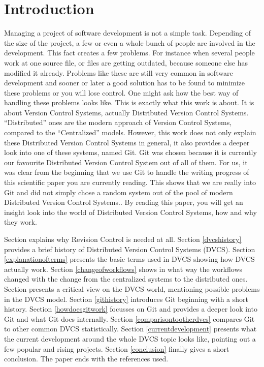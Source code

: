 \section {Introduction}

Managing a project of software development is not a simple task. Depending of the size of the project, a few or even a whole bunch of people are involved in the development. This fact creates a few problems. For instance when several people work at one source file, or files are getting outdated, because someone else has modified it already. Problems like these are still very common in software development and sooner or later a good solution has to be found to minimize these problems or you will lose control. One might ask how the best way of handling these problems looks like.
This is exactly what this work is about. It is about Version Control Systems, actually Distributed Version Control Systems. "`Distributed"' ones are the modern approach of Version Control Systems, compared to the "`Centralized"' models. However, this work does not only explain these Distributed Version Control Systems in general, it also provides a deeper look into one of these systems, named Git.
Git was chosen because it is currently our favourite Distributed Version Control System out of all of them. For us, it was clear from the beginning that we use Git to handle the writing progress of this scientific paper you are currently reading. This shows that we are really into Git and did not simply chose a random system out of the pool of modern Distributed Version Control Systems..
By reading this paper, you will get an insight look into the world of Distributed Version Control Systems, how and why they work.

Section \label{whyrevisioncontrol} explains why Revision Control is needed at all. Section \ref{dvcshistory} provides a brief history of Distributed Version Control Systems (DVCS). Section \ref{explanationofterms} presents the basic terms used in DVCS showing how DVCS actually work. Section \ref{changeofworkflows} shows in what way the workflows changed with the change from the centralized systems to the distributed ones. Section \label{critismondvcs} presents a critical view on the DVCS world, mentioning possible problems in the DVCS model. Section \ref{githistory} introduces Git beginning with a short history. Section \ref{howdoesgitwork} focusses on Git and provides a deeper look into Git and what Git does internally. Section \ref{comparisontootherdvcs} compares Git to other common DVCS statistically. Section \ref{currentdevelopment} presents what the current development around the whole DVCS topic looks like, pointing out a few popular and rising projects. Section \ref{conclusion} finally gives a short conclusion. The paper ends with the references used. 